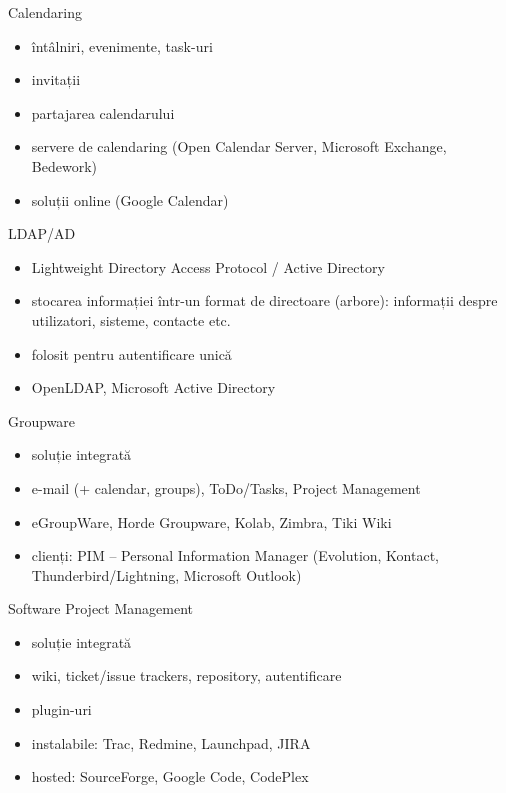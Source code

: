 \documentclass{beamer}
\begin{document}
\begin{frame}{Calendaring}
  \begin{itemize}
    \pause
    \item întâlniri, evenimente, task-uri
    \item invitații
    \item partajarea calendarului
    \item servere de calendaring (Open Calendar Server, Microsoft Exchange,
    Bedework)
    \item soluții online (Google Calendar)
  \end{itemize}
\end{frame}

\begin{frame}{LDAP/AD}
  \begin{itemize}
    \pause
    \item Lightweight Directory Access Protocol / Active Directory
    \item stocarea informației într-un format de directoare (arbore):
    informații despre utilizatori, sisteme, contacte etc.
    \item folosit pentru autentificare unică
    \item OpenLDAP, Microsoft Active Directory
  \end{itemize}
\end{frame}

\begin{frame}{Groupware}
  \begin{itemize}
    \pause
    \item soluție integrată
    \item e-mail (+ calendar, groups), ToDo/Tasks, Project Management
    \item eGroupWare, Horde Groupware, Kolab, Zimbra, Tiki Wiki
    \item clienți: PIM -- Personal Information Manager (Evolution, Kontact,
    Thunderbird/Lightning, Microsoft Outlook)
  \end{itemize}
\end{frame}

\begin{frame}{Software Project Management}
  \begin{itemize}
    \pause
    \item soluție integrată
    \item wiki, ticket/issue trackers, repository, autentificare
    \item plugin-uri
    \item instalabile: Trac, Redmine, Launchpad, JIRA
    \item hosted: SourceForge, Google Code, CodePlex
  \end{itemize}
\end{frame}
\end{document}
